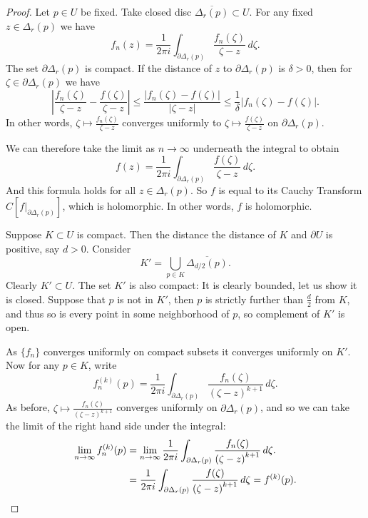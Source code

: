 \documentclass[12pt,openany]{book}
\newcommand{\sabs}[1]{\lvert {#1} \rvert}
\newcommand{\abs}[1]{\left\lvert {#1} \right\rvert}
\theoremstyle{plain}
\theoremstyle{remark}
\theoremstyle{definition}
\theoremstyle{exercise}
\theoremstyle{example}
\begin{document}
\begin{proof}
Let $p \in U$ be fixed.  Take closed disc $\overline{\Delta_r(p)} \subset
U$.  For any fixed $z \in \Delta_r(p)$ we have
\begin{equation*}
f_n(z) = \frac{1}{2\pi i}
\int_{\partial \Delta_r(p)} \frac{f_n(\zeta)}{\zeta-z} \, d\zeta .
\end{equation*}
The set $\partial \Delta_r(p)$ is compact.  If the distance of $z$ to
$\partial \Delta_r(p)$ is $\delta > 0$, then for $\zeta \in \partial
\Delta_r(p)$ we have
\begin{equation*}
\abs{\frac{f_n(\zeta)}{\zeta-z}
-
\frac{f(\zeta)}{\zeta-z}
}
\leq
\frac{\sabs{f_n(\zeta)-f(\zeta)}}{\sabs{\zeta-z}}
\leq
\frac{1}{\delta}
\sabs{f_n(\zeta)-f(\zeta)} .
\end{equation*}
In other words,
$\zeta \mapsto \frac{f_n(\zeta)}{\zeta-z}$ converges uniformly to 
$\zeta \mapsto \frac{f(\zeta)}{\zeta-z}$ on $\partial \Delta_r(p)$.

We can therefore take the limit as $n \to \infty$ underneath the integral
to obtain
\begin{equation*}
f(z) = \frac{1}{2\pi i}
\int_{\partial \Delta_r(p)} \frac{f(\zeta)}{\zeta-z} \, d\zeta .
\end{equation*}
And this formula holds for all $z \in \Delta_r(p)$.  So $f$ is equal to
its Cauchy Transform
$C[f|_{\partial \Delta_r(p)}]$, which is holomorphic.  In other words,
$f$ is holomorphic.

Suppose $K \subset U$ is compact.  Then the distance the distance of
$K$ and $\partial U$ is positive, say $d > 0$.  Consider 
\begin{equation*}
K' = \bigcup_{p \in K} \overline{\Delta_{d/2}(p)} .
\end{equation*}
Clearly $K' \subset U$.  The set $K'$ is also compact: It is clearly
bounded, let us show it is closed.  Suppose that $p$ is not in $K'$,
then $p$ is strictly further than
$\frac{d}{2}$ from $K$, and thus so is every point in some neighborhood of
$p$, so complement of $K'$ is open.

As $\{ f_n \}$ converges uniformly on compact subsets it converges uniformly
on $K'$.  Now for any $p \in K$, write
\begin{equation*}
f_n^{(k)}(p) =
\frac{1}{2\pi i}
\int_{\partial \Delta_r(p)}
\frac{f_n(\zeta)}{{(\zeta-z)}^{k+1}} \, d\zeta .
\end{equation*}
As before, 
$\zeta \mapsto \frac{f_n(\zeta)}{{(\zeta-z)}^{k+1}}$ converges uniformly
on $\partial \Delta_r(p)$, and so we can take the limit of the right hand
side under the integral:
\begin{equation*}
\begin{split}
\lim_{n\to\infty}
f_n^{(k)}(p) 
& =
\lim_{n\to\infty}
\frac{1}{2\pi i}
\int_{\partial \Delta_r(p)}
\frac{f_n(\zeta)}{{(\zeta-z)}^{k+1}} \, d\zeta .
\\
& =
\frac{1}{2\pi i}
\int_{\partial \Delta_r(p)}
\frac{f(\zeta)}{{(\zeta-z)}^{k+1}} \, d\zeta 
=
f^{(k)}(p) . \qedhere
\end{split}
\end{equation*}
\end{proof}
\end{document}
